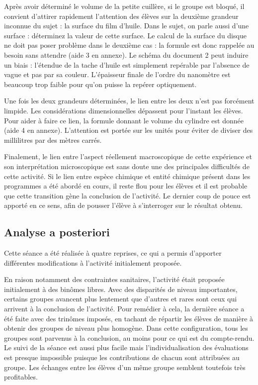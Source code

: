 \documentclass[12pt,a4paper]{article}
\begin{document}
Après avoir déterminé le volume de la petite cuillère, si le groupe est bloqué, il convient d'attirer rapidement l'attention des élèves sur la deuxième grandeur inconnue du sujet : la surface du film d'huile.
\og Dans le sujet, on parle aussi d'une surface : déterminez la valeur de cette surface.\fg{} 
Le calcul de la surface du disque ne doit pas poser problème dans le deuxième cas : la formule est donc rappelée au besoin sans attendre (aide 3 en annexe).
Le schéma du document 2 peut induire un biais : l'étendue de la tache d'huile est simplement repérable par l'absence de vague et pas par sa couleur.
L'épaisseur finale de l'ordre du nanomètre est beaucoup trop faible pour qu'on puisse la repérer optiquement.

Une fois les deux grandeurs déterminées, le lien entre les deux n'est pas forcément limpide.
Les considérations dimensionnelles dépassent pour l'instant les élèves.
Pour aider à faire ce lien, la formule donnant le volume du cylindre est donnée (aide 4 en annexe).
L'attention est portée sur les unités pour éviter de diviser des millilitres par des mètres carrés.

Finalement, le lien entre l'aspect réellement macroscopique de cette expérience et son interprétation microscopique est sans doute une des principales difficultés de cette activité.
Si le lien entre espèce chimique et entité chimique présent dans les programmes a été abordé en cours, il reste flou pour les élèves et il est probable que cette transition gène la conclusion de l'activité.
Le dernier coup de pouce est apporté en ce sens, afin de pousser l'élève à s'interroger sur le résultat obtenu.

\subsection{Analyse a posteriori}

Cette séance a été réalisée à quatre reprises, ce qui a permis d'apporter différentes modifications à l'activité initialement proposée.

En raison notamment des contraintes sanitaires, l'activité était proposée initialement à des binômes libres.
Avec des disparités de niveau importantes, certains groupes avancent plus lentement que d'autres et rares sont ceux qui arrivent à la conclusion de l'activité.
Pour remédier à cela, la dernière séance a été faite avec des trinômes imposés, en tachant de répartir les élèves de manière à obtenir des groupes de niveau plus homogène.
Dans cette configuration, tous les groupes sont parvenus à la conclusion, au moins pour ce qui est du compte-rendu.
Le suivi de la séance est aussi plus facile mais l'individualisation des évaluations est presque impossible puisque les contributions de chacun sont attribuées au groupe.
Les échanges entre les élèves d'un même groupe semblent toutefois très profitables.
\end{document}
